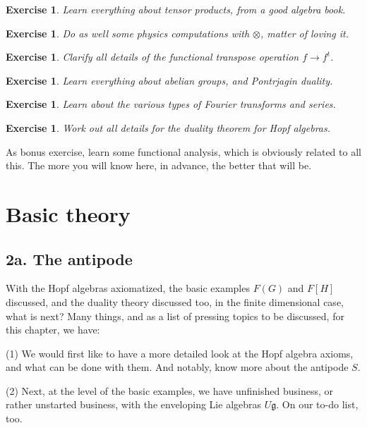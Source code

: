 \documentclass[12pt]{amsbook}
\newtheorem{exercise}[theorem]{Exercise}
\begin{document}
\begin{exercise}
Learn everything about tensor products, from a good algebra book.
\end{exercise}

\begin{exercise}
Do as well some physics computations with $\otimes$, matter of loving it.
\end{exercise}

\begin{exercise}
Clarify all details of the functional transpose operation $f\to f^t$.
\end{exercise}

\begin{exercise}
Learn everything about abelian groups, and Pontrjagin duality.
\end{exercise}

\begin{exercise}
Learn about the various types of Fourier transforms and series.
\end{exercise}

\begin{exercise}
Work out all details for the duality theorem for Hopf algebras.
\end{exercise}

As bonus exercise, learn some functional analysis, which is obviously related to all this. The more you will know here, in advance, the better that will be.

\chapter{Basic theory}

\section*{2a. The antipode}

With the Hopf algebras axiomatized, the basic examples $F(G)$ and $F[H]$ discussed, and the duality theory discussed too, in the finite dimensional case, what is next? Many things, and as a list of pressing topics to be discussed, for this chapter, we have:

\bigskip

(1) We would first like to have a more detailed look at the Hopf algebra axioms, and what can be done with them. And notably, know more about the antipode $S$.

\bigskip

(2) Next, at the level of the basic examples, we have unfinished business, or rather unstarted business, with the enveloping Lie algebras $U\mathfrak g$. On our to-do list, too.
\end{document}
